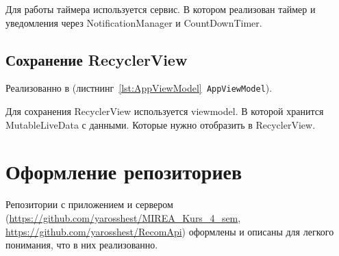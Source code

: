 Для работы таймера используется сервис.
В котором реализован таймер и уведомления через NotificationManager
и CountDownTimer.

\subsection{Сохранение RecyclerView}

Реализованно в (листнинг~\ref{lst:AppViewModel}\texttt{ AppViewModel}).

Для сохранения RecyclerView используется viewmodel.
В которой хранится MutableLiveData с данными.
Которые нужно отобразить в RecyclerView.

\section{Оформление репозиториев}

Репозитории с приложением и сервером (\url{https://github.com/yarosshest/MIREA_Kurs_4_sem}, \url{https://github.com/yarosshest/RecomApi})
оформлены и описаны для легкого понимания, что в них реализованно.

